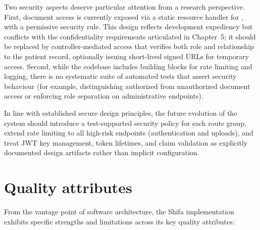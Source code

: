 \documentclass[11pt,a4paper,twoside,openany,headings=normal]{scrreprt}
\newcommand{\codepath}[1]{\texttt{\detokenize{#1}}}
\let\path\codepath
\begin{document}
Two security aspects deserve particular attention from a research perspective. First, document access is currently exposed via a static resource handler for \path{/patientdocuments/**}, with a permissive security rule. This design reflects development expediency but conflicts with the confidentiality requirements articulated in Chapter~5; it should be replaced by controller-mediated access that verifies both role and relationship to the patient record, optionally issuing short-lived signed URLs for temporary access. Second, while the codebase includes building blocks for rate limiting and logging, there is no systematic suite of automated tests that assert security behaviour (for example, distinguishing authorized from unauthorized document access or enforcing role separation on administrative endpoints).

In line with established secure design principles, the future evolution of the system should introduce a test-supported security policy for each route group, extend rate limiting to all high-risk endpoints (authentication and uploads), and treat JWT key management, token lifetimes, and claim validation as explicitly documented design artifacts rather than implicit configuration.

\section{Quality attributes}

From the vantage point of software architecture, the Shifa implementation exhibits specific strengths and limitations across its key quality attributes:
\end{document}
